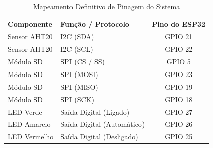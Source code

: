 \begin{table}[h]
\centering
\caption{Mapeamento Definitivo de Pinagem do Sistema}
\vspace{0.2cm}
\begin{tabular}{@{}llc@{}}
\toprule
\textbf{Componente} & \textbf{Função / Protocolo} & \textbf{Pino do ESP32} \\ \midrule
Sensor AHT20        & I2C (SDA)                   & GPIO 21                \\
Sensor AHT20        & I2C (SCL)                   & GPIO 22                \\ \addlinespace
Módulo SD           & SPI (CS / SS)               & GPIO 5                 \\
Módulo SD           & SPI (MOSI)                  & GPIO 23                \\
Módulo SD           & SPI (MISO)                  & GPIO 19                \\
Módulo SD           & SPI (SCK)                   & GPIO 18                \\ \addlinespace
LED Verde           & Saída Digital (Ligado)      & GPIO 27                \\
LED Amarelo         & Saída Digital (Automático)  & GPIO 26                \\
LED Vermelho        & Saída Digital (Desligado)   & GPIO 25                \\ \bottomrule
\end{tabular}
\end{table}
